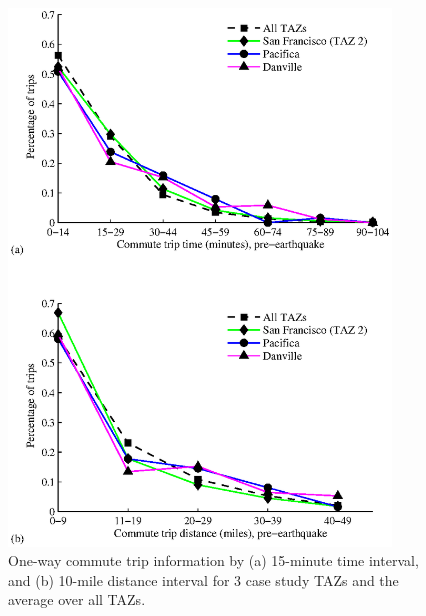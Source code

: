 \begin{figure}
\centering
\includegraphics[width=4in]{FIGS/equity_trip_time_distance_pdfs_by_taz_to_work_and_from_work.eps} 
\caption{One-way commute trip information by (a) 15-minute time interval, and (b) 10-mile distance interval for 3 case study TAZs and the average over all TAZs.}
\label{fig:time_distance_pdfs}
\end{figure}





